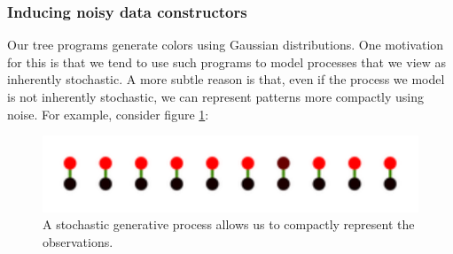 \documentclass[a4paper,10pt]{article}
\begin{document}
\subsubsection{Inducing noisy data constructors}

Our tree programs generate colors using Gaussian distributions. One motivation for this is that we tend to use such programs to model processes that we view as inherently stochastic. A more subtle reason is that, even if the process we model is not inherently stochastic, we can represent patterns more compactly using noise. For example, consider figure \ref{fig:noiseCons}:

\begin{figure}[h]
\begin{center}
\includegraphics[scale=.60]{../figures/noisyConstructor.pdf}
\end{center}
\caption{A stochastic generative process allows us to compactly represent the observations.}
\label{fig:noiseCons}
\end{figure}
\end{document}
